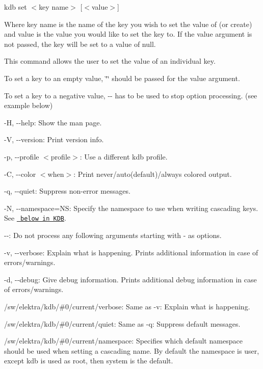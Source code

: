 {\ttfamily kdb set $<$key name$>$ \mbox{[}$<$value$>$\mbox{]}}

Where {\ttfamily key name} is the name of the key you wish to set the value of (or create) and {\ttfamily value} is the value you would like to set the key to. If the {\ttfamily value} argument is not passed, the key will be set to a value of {\ttfamily null}.

This command allows the user to set the value of an individual key.

To set a key to an empty value, {\ttfamily \char`\"{}\char`\"{}} should be passed for the {\ttfamily value} argument.

To set a key to a negative value, {\ttfamily -\/-\/} has to be used to stop option processing. (see example below)


\begin{DoxyItemize}
\item {\ttfamily -\/H}, {\ttfamily -\/-\/help}\+: Show the man page.
\item {\ttfamily -\/V}, {\ttfamily -\/-\/version}\+: Print version info.
\item {\ttfamily -\/p}, {\ttfamily -\/-\/profile $<$profile$>$}\+: Use a different kdb profile.
\item {\ttfamily -\/C}, {\ttfamily -\/-\/color $<$when$>$}\+: Print never/auto(default)/always colored output.
\item {\ttfamily -\/q}, {\ttfamily -\/-\/quiet}\+: Suppress non-\/error messages.
\item {\ttfamily -\/N}, {\ttfamily -\/-\/namespace=NS}\+: Specify the namespace to use when writing cascading keys. See \href{\#KDB}{\texttt{ below in K\+DB}}.
\item {\ttfamily -\/-\/}\+: Do not process any following arguments starting with {\ttfamily -\/} as options.
\item {\ttfamily -\/v}, {\ttfamily -\/-\/verbose}\+: Explain what is happening. Prints additional information in case of errors/warnings.
\item {\ttfamily -\/d}, {\ttfamily -\/-\/debug}\+: Give debug information. Prints additional debug information in case of errors/warnings.
\end{DoxyItemize}


\begin{DoxyItemize}
\item {\ttfamily /sw/elektra/kdb/\#0/current/verbose}\+: Same as {\ttfamily -\/v}\+: Explain what is happening.
\item {\ttfamily /sw/elektra/kdb/\#0/current/quiet}\+: Same as {\ttfamily -\/q}\+: Suppress default messages.
\item {\ttfamily /sw/elektra/kdb/\#0/current/namespace}\+: Specifies which default namespace should be used when setting a cascading name. By default the namespace is user, except {\ttfamily kdb} is used as root, then {\ttfamily system} is the default.
\end{DoxyItemize}

